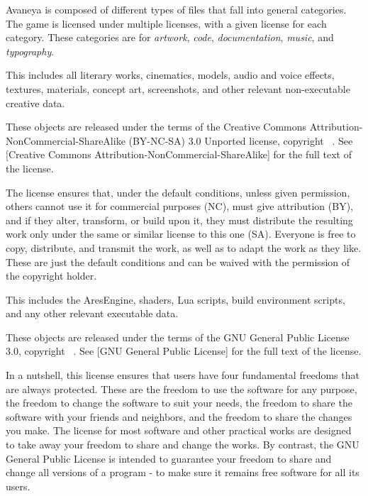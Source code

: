 

Avaneya is composed of different types of files that fall into general categories. The game is licensed under multiple licenses, with a given license for each category. These categories are for {\it artwork}, {\it code}, {\it documentation}, {\it music}, and {\it typography}.

\startitemize[4]
\setupwhitespace[big]

This includes all literary works, cinematics, models, audio and voice effects, textures, materials, concept art, screenshots, and other relevant non-executable creative data. 

These objects are released under the terms of the Creative Commons Attribution-NonCommercial-ShareAlike (BY-NC-SA) 3.0 Unported license, copyright \CopyrightDates\ \CopyrightHolder. See [Creative Commons Attribution-NonCommercial-ShareAlike] for the full text of the license.

The license ensures that, under the default conditions, unless given permission, others cannot use it for commercial purposes (NC), must give attribution (BY), and if they alter, transform, or build upon it, they must distribute the resulting work only under the same or similar license to this one (SA). Everyone is free to copy, distribute, and transmit the work, as well as to adapt the work as they like. These are just the default conditions and can be waived with the permission of the copyright holder.


This includes the AresEngine, shaders, Lua scripts, build environment scripts, and any other relevant executable data.

These objects are released under the terms of the GNU General Public License 3.0, copyright \CopyrightDates\ \CopyrightHolder. See [GNU General Public License] for the full text of the license.

In a nutshell, this license ensures that users have four fundamental freedoms that are always protected. These are the freedom to use the software for any purpose, the freedom to change the software to suit your needs, the freedom to share the software with your friends and neighbors, and the freedom to share the changes you make. The license for most software and other practical works are designed to take away your freedom to share and change the works. By contrast, the GNU General Public License is intended to guarantee your freedom to share and change all versions of a program - to make sure it remains free software for all its users.

